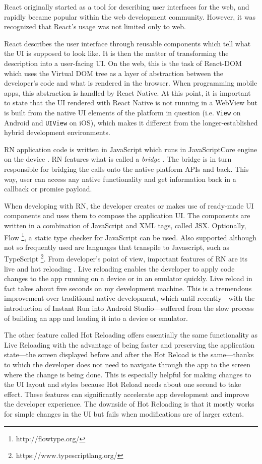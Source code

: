 React originally started as a tool for describing user interfaces for the web, and rapidly became popular within the web development community. However, it was recognized that React's usage was not limited only to web.

React describes the user interface through reusable components which tell what the UI is supposed to look like. It is then the matter of transforming the description into a user-facing UI. On the web, this is the task of React-DOM which uses the Virtual DOM tree as a layer of abstraction between the developer's code and what is rendered in the browser. When programming mobile apps, this abstraction is handled by React Native. At this point, it is important to state that the UI rendered with React Native is not running in a WebView but is built from the native UI elements of the platform in question (i.e. \texttt{View} on Android and \texttt{UIView} on iOS), which makes it different from the longer-established hybrid development environments. 

RN application code is written in JavaScript which runs in JavaScriptCore engine on the device \cite{rn:jsenviroment}. RN features what is called a \textit{bridge} \cite{rn:bridge}. The bridge is in turn responsible for bridging the calls onto the native platform APIs and back. This way, user can access any native functionality and get information back in a callback or promise payload.

When developing with RN, the developer creates or makes use of ready-made UI components and uses them to compose the application UI. The components are written in a combination of JavaScript and XML tags, called JSX. Optionally, Flow \footnote{http://flowtype.org/}, a static type checker for JavaScript can be used. Also supported although not so frequently used are languages that transpile to Javascript, such as TypeScript \footnote{https://www.typescriptlang.org/}. From developer's point of view, important features of RN are its live and hot reloading \cite{rn:hotreload}. Live reloading  enables the developer to apply code changes to the app running on a device or in an emulator quickly. Live reload in fact takes about five seconds on my development machine. This is a tremendous improvement over traditional native development, which until recently---with the introduction of Instant Run into Android Studio---suffered from the slow process of building an app and loading it into a device or emulator.

The other feature called Hot Reloading  offers essentially the same functionality as Live Reloading with the advantage of being faster and preserving the application state---the screen displayed before and after the Hot Reload is the same---thanks to which the developer does not need to navigate through the app to the screen where the change is being done. This is especially helpful for making changes to the UI layout and styles because Hot Reload needs about one second to take effect. These features can significantly accelerate app development and improve the developer experience. The downside of Hot Reloading is that it mostly works for simple changes in the UI but fails when modifications are of larger extent.

